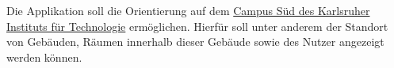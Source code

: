 
Die Applikation soll die Orientierung auf dem \href{https://www.kit.edu/kit/campus_sued_pkw.php}{Campus Süd des Karlsruher Instituts für Technologie}
 ermöglichen. Hierfür soll unter anderem der Standort von Gebäuden, Räumen innerhalb dieser Gebäude sowie
 des Nutzer angezeigt werden können.
 